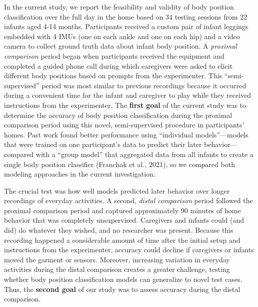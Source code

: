 \documentclass[
  man]{apa6}
\begin{document}
In the current study, we report the feasibility and validity of body position classification over the full day in the home based on 34 testing sessions from 22 infants aged 4-14 months. Participants received a custom pair of infant leggings embedded with 4 IMUs (one on each ankle and one on each hip) and a video camera to collect ground truth data about infant body position. A \emph{proximal comparison} period began when participants received the equipment and completed a guided phone call during which caregivers were asked to elicit different body positions based on prompts from the experimenter. This ``semi-supervised'' period was most similar to previous recordings because it occurred during a convenient time for the infant and caregiver to play while they received instructions from the experimenter. The \textbf{first goal} of the current study was to determine the accuracy of body position classification during the proximal comparison period using this novel, semi-supervised procedure in participants' homes. Past work found better performance using ``individual models''---models that were trained on one participant's data to predict their later behavior---compared with a ``group model'' that aggregated data from all infants to create a single body position classifier (Franchak et al., 2021), so we compared both modeling approaches in the current investigation.

The crucial test was how well models predicted later behavior over longer recordings of everyday activities. A second, \emph{distal comparison} period followed the proximal comparison period and captured approximately 90 minutes of home behavior that was completely unsupervised. Caregivers and infants could (and did) do whatever they wished, and no researcher was present. Because this recording happened a considerable amount of time after the initial setup and instructions from the experimenter, accuracy could decline if caregivers or infants moved the garment or sensors. Moreover, increasing variation in everyday activities during the distal comparison creates a greater challenge, testing whether body position classification models can generalize to novel test cases. Thus, the \textbf{second goal} of our study was to assess accuracy during the distal comparison.
\end{document}
